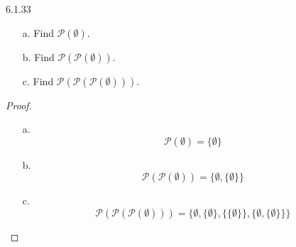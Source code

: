 \begin{question}
    {6.1.33}
    {
        \vspace{-\baselineskip}
        \begin{enumerate}
            \item[a.] Find $\mathscr{P}(\emptyset)$.
            \item[b.] Find $\mathscr{P}(\mathscr{P}(\emptyset))$.
            \item[c.] Find $\mathscr{P}(\mathscr{P}(\mathscr{P}(\emptyset)))$.
        \end{enumerate}
    }
\end{question}
\begin{proof}
    \begin{enumerate}
        \item[a.] 
        \begin{equation*}
            \mathscr{P}(\emptyset) = \{\emptyset\}
        \end{equation*}
    
        \item[b.] 
        \begin{equation*}
            \mathscr{P}(\mathscr{P}(\emptyset)) = \{\emptyset, \{\emptyset\}\}
        \end{equation*}
    
        \item[c.] 
        \begin{equation*}
            \mathscr{P}(\mathscr{P}(\mathscr{P}(\emptyset))) = \{\emptyset, \{\emptyset\}, \{\{\emptyset\}\}, \{\emptyset, \{\emptyset\}\}\}
        \end{equation*}
    \end{enumerate}
\end{proof}
